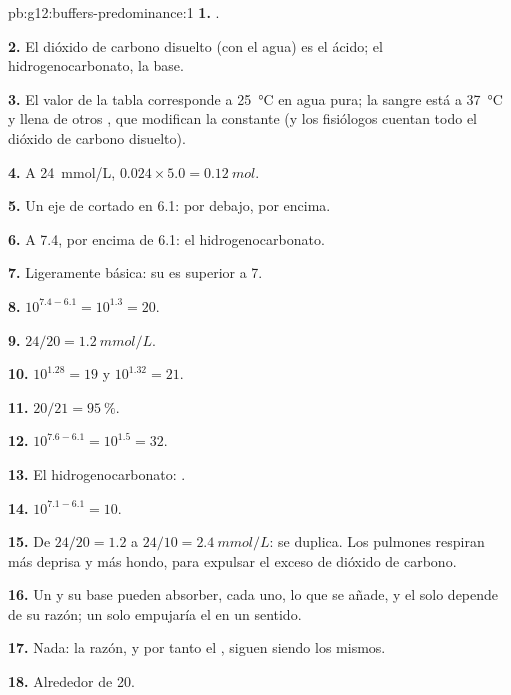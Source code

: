 \begin{solution}{pb:g12:buffers-predominance:1}
\textbf{1.} .

\textbf{2.} El dióxido de carbono disuelto (con el agua) es el ácido; el
hidrogenocarbonato, la base.

\textbf{3.} El valor de la tabla corresponde a \qty{25}{\celsius} en agua
pura; la sangre está a \qty{37}{\celsius} y llena de otros , que
modifican la constante (y los fisiólogos cuentan todo el dióxido de
carbono disuelto).

\textbf{4.} A \qty{24}{mmol/L}, $0.024 \times 5.0 = \qty{0.12}{mol}$.

\textbf{5.} Un eje de  cortado en 6.1:  por debajo, 
por encima.

\textbf{6.} A 7.4, por encima de 6.1: el hidrogenocarbonato.

\textbf{7.} Ligeramente básica: su  es superior a 7.

\textbf{8.} $10^{7.4 - 6.1} = 10^{1.3} = 20$.

\textbf{9.} $24 / 20 = \qty{1.2}{mmol/L}$.

\textbf{10.} $10^{1.28} = 19$ y $10^{1.32} = 21$.

\textbf{11.} $20/21 = \qty{95}{\percent}$.

\textbf{12.} $10^{7.6 - 6.1} = 10^{1.5} = 32$.

\textbf{13.} El  hidrogenocarbonato:
.

\textbf{14.} $10^{7.1 - 6.1} = 10$.

\textbf{15.} De $24/20 = 1.2$ a $24/10 = \qty{2.4}{mmol/L}$: se duplica.
Los pulmones respiran más deprisa y más hondo, para expulsar el exceso de
dióxido de carbono.

\textbf{16.} Un  y su base pueden absorber, cada uno, lo que
se añade, y el  solo depende de su razón; un  solo
empujaría el  en un sentido.

\textbf{17.} Nada: la razón, y por tanto el , siguen siendo los mismos.

\textbf{18.} Alrededor de 20.
\end{solution}
